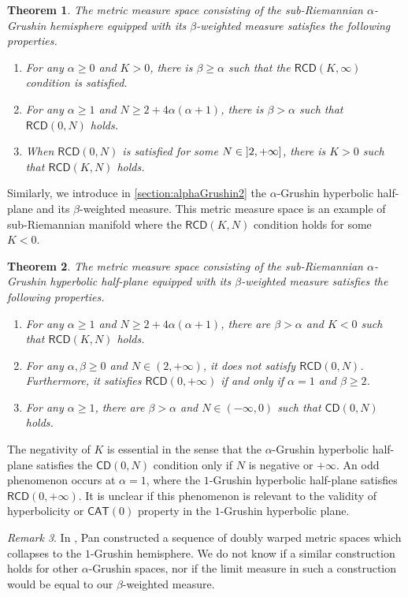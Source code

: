 \documentclass[11pt,twoside,a4paper]{article}
\newcommand{\cd}{\mathsf{CD}}
\newcommand{\BE}{\mathsf{BE}}
\newcommand{\RCD}{\mathsf{RCD}}
\theoremstyle{theorem}
\newtheorem{theorem}{Theorem}[section]
\theoremstyle{definition}
\theoremstyle{remark}
\newtheorem{remark}[theorem]{Remark}
\theoremstyle{proof}
\begin{document}
\begin{theorem}
\label{thm:main1}
The metric measure space consisting of the sub-Riemannian $\alpha$-Grushin hemisphere equipped with its $\beta$-weighted measure satisfies the following properties.
\begin{enumerate}[label=\normalfont(\roman*)]
    \item For any $\alpha\geq 0$ and $K>0$, there is $\beta\geq\alpha$ such that the $\RCD(K,\infty)$ condition is satisfied.
    \item For any $\alpha\geq 1$ and $N\geq 2+4\alpha(\alpha+1)$, there is $\beta>\alpha$ such that $\RCD(0,N)$ holds.
    \item When $\RCD(0,N)$ is satisfied for some $N \in \linterval{2}{+\infty}$, there is $K>0$ such that $\RCD(K,N)$ holds.
\end{enumerate}
\end{theorem}
Similarly, we introduce in \cref{section:alphaGrushin2} the $\alpha$-Grushin hyperbolic half-plane and its $\beta$-weighted measure. This metric measure space is an example of sub-Riemannian manifold where the $\mathsf{RCD}(K, N)$ condition holds for some $K < 0$.


\begin{theorem}
\label{thm:main2}
    The metric measure space consisting of the sub-Riemannian $\alpha$-Grushin hyperbolic half-plane equipped with its $\beta$-weighted measure satisfies the following properties.
    \begin{enumerate}[label=\normalfont(\roman*)]
    \item For any $\alpha\geq 1$ and $N\geq 2+4\alpha(\alpha+1)$,
    there are $\beta>\alpha$ and $K<0$ such that $\RCD(K,N)$ holds.
    \item For any $\alpha,\beta\geq0$ and $N\in(2,+\infty)$, it does not satisfy $\RCD(0,N)$. Furthermore, it satisfies $\RCD(0,+\infty)$ if and only if $\alpha=1$ and $\beta\geq 2$.
    \item For any $\alpha\geq 1$,
        there are $\beta>\alpha$ and $N\in(-\infty,0)$ such that $\cd(0,N)$ holds.
\end{enumerate}
\end{theorem}
The negativity of $K$ is essential in the sense that the $\alpha$-Grushin hyperbolic half-plane satisfies the $\cd(0,N)$ condition only if $N$ is negative or $+\infty$.
An odd phenomenon occurs at $\alpha=1$, where the $1$-Grushin hyperbolic half-plane satisfies $\RCD(0,+\infty)$. It is unclear if this phenomenon is relevant to the validity of hyperbolicity or $\mathsf{CAT}(0)$ property in the $1$-Grushin hyperbolic plane.
\begin{remark}
In \cite{Pan23}, Pan constructed a sequence of doubly warped metric spaces which collapses to the $1$-Grushin hemisphere. We do not know if a similar construction holds for other $\alpha$-Grushin spaces, nor if the limit measure in such a construction would be equal to our $\beta$-weighted measure.
\end{remark}
\end{document}
